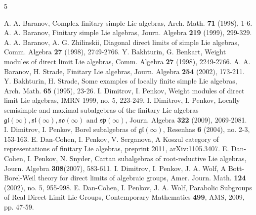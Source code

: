 \documentclass[10pt]{amsart}
\newcommand{\so}{\mathfrak{so}}
\renewcommand{\sp}{\mathfrak{sp}}
\renewcommand{\sl}{\mathfrak{sl}}
\newcommand{\gl}{\mathfrak{gl}}
\begin{document}
\begin{thebibliography}{5}

 A. A. Baranov, Complex finitary simple Lie algebras, Arch. Math. \textbf{71} (1998), 1-6.
\vspace{0.2cm}
 A. A. Baranov, Finitary simple Lie algebras, Journ. Algebra \textbf{219} (1999), 299-329.
\vspace{0.2cm}
 A. A. Baranov, A. G. Zhilinskii, Diagonal direct limits of simple Lie algebras, Comm. Algebra \textbf{27} (1998), 2749-2766.
\vspace{0.2cm}
 Y. Bakhturin, G. Benkart, Weight modules of direct limit Lie algebras, Comm. Algebra \textbf{27} (1998), 2249-2766.
\vspace{0.2cm}
 A. A. Baranov, H. Strade, Finitary Lie algebras, Journ. Algebra \textbf{254} (2002), 173-211.
\vspace{0.2cm}
 Y. Bakhturin, H. Strade, Some examples of locally finite simple Lie algebras, Arch. Math. \textbf{65} (1995), 23-26.
\vspace{0.2cm}
 I. Dimitrov, I. Penkov, Weight modules of direct limit Lie algebras, IMRN 1999, no. 5, 223-249.
\vspace{0.2cm}
 I. Dimitrov, I. Penkov, Locally semisimple and maximal subalgebras of the finitary Lie algebras $\mathfrak{gl}(\infty), \sl(\infty), \so(\infty)$ and $\sp(\infty)$, Journ. Algebra \textbf{322} (2009), 2069-2081.  
\vspace{0.2cm}
 I. Dimitrov, I. Penkov, Borel subalgebras of $\gl(\infty)$, Resenhas \textbf{6} (2004), no. 2-3, 153-163.
\vspace{0.2cm}
 E. Dan-Cohen, I. Penkov, V. Serganova, A Koszul category of representations of finitary Lie algebras, preprint 2011, arXiv:1105.3407.
\vspace{0.2cm}
 E. Dan-Cohen, I. Penkov, N. Snyder, Cartan subalgebras of root-reductive Lie algebras, Journ. Algebra \textbf{308}(2007), 583-611.
\vspace{0.2cm}
 I. Dimitrov, I. Penkov, J. A. Wolf, A Bott-Borel-Weil theory for direct limits of algebraic groups, Amer. Journ. Math. \textbf{124} (2002), no. 5, 955-998.\vspace{0.2cm}
 E. Dan-Cohen, I. Penkov, J. A. Wolf, Parabolic Subgroups of Real Direct Limit Lie Groups, Contemporary Mathematics \textbf{499}, AMS, 2009, pp. 47-59.

\end{thebibliography}
\end{document}

